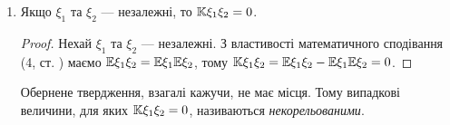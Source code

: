 \begin{enumerate}
\begin{proof}
\begin{enumerate}[label=\Roman*.]
            $\left|\K\xi_1\xi_2\right| \leq \sigma_{\xi_1} \sigma_{\xi_2}$.

            \item Введемо нормовані центровані випадкові величини $\xi_H = \frac{\xi - \E\xi}
            {\sigma_\xi}$, $\E\xi_H =0$, $\D\xi_H = 1$.

            $\E(\xi_{1H} \pm \xi_{2H})^2 \geq 0 \Leftrightarrow 
            \E(\xi^2_{1H}\pm2\xi_{1H}\xi_{2H}+\xi^2_{2H}) \geq 0 
            \Leftrightarrow 2 \pm 
            2\frac{\K\xi_1\xi_2}{\sigma_{\xi_1}\sigma_{\xi_2}} \geq 0 
            \Leftrightarrow $

            $\left|\K\xi_1\xi_2\right| \leq \sigma_{\xi_1} \sigma_{\xi_2}$.
        \end{enumerate}
    \end{proof}
    \item Якщо $\xi_1$ та $\xi_2$ --- незалежні, то $\mathbb{K}\xi_1\xi_2 = 0$.
    \begin{proof}
        Нехай $\xi_1$ та $\xi_2$ --- незалежні.
        З властивості математичного сподівання (4, ст. \pageref{eq:EXY_indep}) маємо
        $\mathbb{E}\xi_1 \xi_2 = \mathbb{E}\xi_1 \mathbb{E}\xi_2$, тому
        $\mathbb{K}\xi_1 \xi_2 = \mathbb{E}\xi_1 \xi_2 - \mathbb{E}\xi_1 \mathbb{E}\xi_2 = 0$.
    \end{proof}

    Обернене твердження, взагалі кажучи, не має місця. Тому випадкові 
    величини, для яких $\mathbb{K}\xi_1\xi_2 = 0$, називаються 
    \emph{некорельованими}. 
\end{enumerate}

